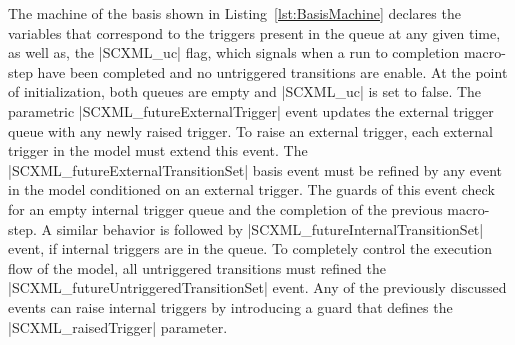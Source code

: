 The machine of the basis shown in Listing~\ref{lst:BasisMachine} declares the variables that correspond to the triggers 
present in the queue at any given time, as well as, the |SCXML_uc| flag, which signals when a run to completion macro-step 
have been completed and no untriggered transitions are enable. At the point of initialization, both queues are empty and
|SCXML_uc| is set to false. The parametric |SCXML_futureExternalTrigger| event updates the external trigger queue with any 
newly raised trigger. To raise an external trigger, each external trigger in the model must extend this event. 
The |SCXML_futureExternalTransitionSet| basis event must be refined by any event in the model conditioned on an external trigger. 
The guards of this event check for an empty internal trigger queue and the completion of the previous macro-step. 
A similar behavior is followed by |SCXML_futureInternalTransitionSet| event, if internal triggers are in the queue.  
To completely control the execution flow of the model, all untriggered transitions must refined the |SCXML_futureUntriggeredTransitionSet|
event. Any of the previously discussed events can raise internal triggers by introducing a guard that defines the |SCXML_raisedTrigger| parameter.

